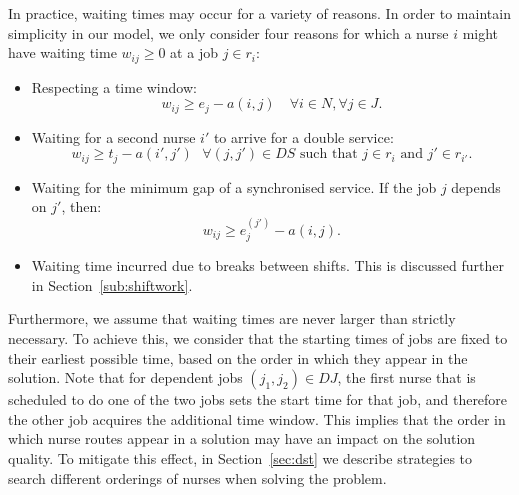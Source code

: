 \documentclass[a4paper,11pt,authoryear]{elsarticle}
\begin{document}
In practice, waiting times may occur for a variety of reasons. In order to maintain simplicity in our model, we only consider four reasons for which a nurse $i$ might have waiting time $w_{ij} \geq 0$ at a job $j \in r_i$:
\begin{itemize}
    \item Respecting a time window: 
    \begin{equation}
        w_{ij} \geq e_j - a(i,j) \quad \forall i \in N, \forall j \in J. \label{eq:waiting1TW}
    \end{equation}
    \item Waiting for a second nurse $i'$ to arrive for a double service:
    \begin{equation}
       w_{i j} \geq t_j - a(i',j') \text{ } \forall (j,j') \in DS \text{ such that } j \in r_{i} \text{ and } j' \in r_{i'}. \label{eq:waiting2DS}
    \end{equation}
    \item Waiting for the minimum gap of a synchronised service. If the job $j$ depends on $j'$, then:
    \begin{equation}\label{eq:waiting3dependent}
        w_{ij} \geq e^{(j')}_{j} - a(i,j).
    \end{equation}
	\item Waiting time incurred due to breaks between shifts. This is discussed further in Section~\ref{sub:shiftwork}.
\end{itemize}

\noindent Furthermore, we assume that waiting times are never larger than strictly necessary. To achieve this, we consider that the starting times of jobs are fixed to their earliest possible time, based on the order in which they appear in the solution. Note that for dependent jobs $(j_1, j_2) \in DJ$, the first nurse that is scheduled to do one of the two jobs sets the start time for that job, and therefore the other job acquires the additional time window. This implies that the order in which nurse routes appear in a solution may have an impact on the solution quality. To mitigate this effect, in Section~\ref{sec:dst} we describe strategies to search different orderings of nurses when solving the problem.
\end{document}
